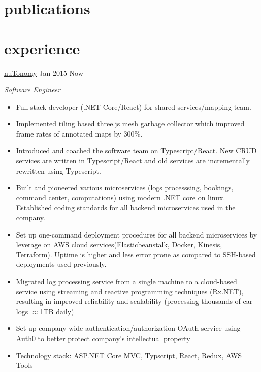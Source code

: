 \documentclass[]{cv} %
\begin{document}
\section{publications}


\section{experience}	
\entry
{\href{http://www.nutonomy.com/}{nuTonomy}}
{Jan 2015 \to Now}
{\emph{Software Engineer}
\begin{itemize}[topsep=2.5pt, parsep=1.5pt]
\item Full stack developer (.NET Core/React) for shared services/mapping team.
\item Implemented tiling based three.js mesh garbage collector which improved frame rates of annotated maps by 300\%.
\item Introduced and coached the software team on Typescript/React. New CRUD services are written in Typescript/React and old services are incrementally rewritten using Typescript.
\item Built and pioneered various microservices (logs processsing, bookings, command center, computations) using modern .NET core on linux. Established coding standards for all backend microservices used in the company.
\item Set up one-command deployment procedures for all backend microservices by leverage on AWS cloud services(Elasticbeanstalk, Docker, Kinesis, Terraform). Uptime is higher and less error prone as compared to SSH-based deployments used previously.
\item Migrated log processing service from a single machine to a cloud-based service using streaming and reactive programming techniques (Rx.NET), resulting in improved reliability and scalability (processing thousands of car logs $\approx$1TB daily)
\item Set up company-wide authentication/authorization OAuth service using Auth0 to better protect company's intellectual property
\item Technology stack: ASP.NET Core MVC, Typscript, React, Redux, AWS Tools
\end{itemize}}
\end{document}
